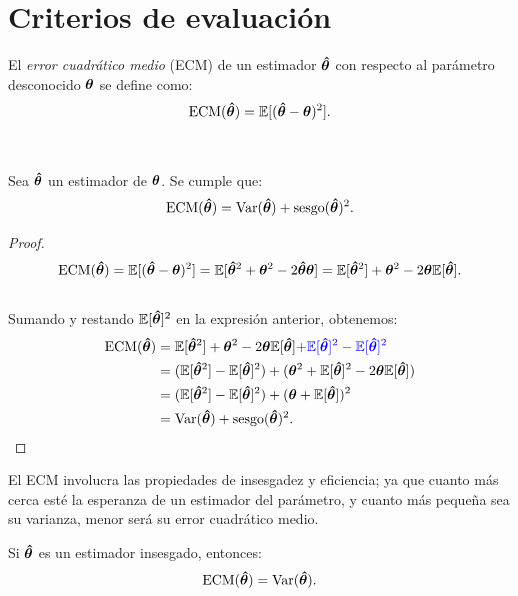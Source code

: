 \documentclass[oneside,openright,titlepage,numbers=noenddot,openany,headinclude,footinclude=true,
cleardoublepage=empty,abstractoff,BCOR=5mm,paper=a4,fontsize=12pt,main=spanish]{scrreprt}
\begin{document}
\clearpage

\section{Criterios de evaluación} \label{sec:coeficientedet}

\begin{definition}
El \textit{error cuadrático medio} (ECM) de un estimador $\bm{\hat{\theta}}$ con respecto al parámetro desconocido $\bm{\theta}$  se define como: $$\text{ECM}(\bm{\hat{\theta}})=\mathbb{E}[(\bm{\hat{\theta}}-\bm{\theta})^2].$$
\end{definition}\

\begin{proposition}
Sea $\bm{\hat{\theta}}$ un estimador de $\bm{\theta}$. Se cumple que:
$$\text{ECM}(\bm{\hat{\theta}})=\text{Var}(\bm{\hat{\theta}})+\text{sesgo}(\bm{\hat{\theta}})^2.$$
\end{proposition}

\begin{proof}
 $$\text{ECM}(\bm{\hat{\theta}})=\mathbb{E}[(\bm{\hat{\theta}}-\bm{\theta})^2]=\mathbb{E}[\bm{\hat{\theta}}^2+\bm{\theta}^2-2\bm{\hat{\theta}} \bm{\theta}]=\mathbb{E}[\bm{\hat{\theta}}^2]+\bm{\theta}^2-2\bm{\theta}\mathbb{E}[\bm{\hat{\theta}}].$$\\
Sumando y restando $\mathbb{E}[\bm{\hat{\theta}}]^2$ en la expresión anterior, obtenemos:\\
  \begin{equation*}
  \begin{split}
 \text{ECM}(\bm{\hat{\theta}})&=\mathbb{E}[\bm{\hat{\theta}}^2]+\bm{\theta}^2-2\bm{\theta}\mathbb{E}[\bm{\hat{\theta}}]\textcolor{blue}{+\mathbb{E}[\bm{\hat{\theta}}]^2-\mathbb{E}[\bm{\hat{\theta}}]^2}\\
 &=(\mathbb{E}[\bm{\hat{\theta}}^2]-\mathbb{E}[\bm{\hat{\theta}}]^2)+(\bm{\theta}^2+\mathbb{E}[\bm{\hat{\theta}}]^2-2\bm{\theta}\mathbb{E}[\bm{\hat{\theta}}])\\
 &=(\mathbb{E}[\bm{\hat{\theta}}^2]-\mathbb{E}[\bm{\hat{\theta}}]^2)+(\bm{\theta}+\mathbb{E}[\bm{\hat{\theta}}])^2\\
 &=\text{Var}(\bm{\hat{\theta}})+\text{sesgo}(\bm{\hat{\theta}})^2.
  \end{split}
  \end{equation*} 
\end{proof}

El ECM involucra las propiedades de insesgadez y
eficiencia; ya que cuanto más cerca esté la esperanza de un estimador del parámetro, y cuanto más pequeña sea su varianza, menor será su error cuadrático medio.\\

\begin{proposition} \label{prop:varecm}
Si $\bm{\hat{\theta}}$ es un estimador insesgado, entonces: $$\text{ECM}(\bm{\hat{\theta}})=\text{Var}(\bm{\hat{\theta}}).$$ 
\end{proposition}\
\end{document}
